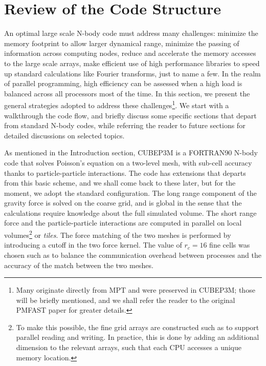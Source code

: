 
\section{Review of the Code Structure}
\label{sec:structure}


An optimal large scale N-body code must address many challenges: minimize the memory footprint to allow larger dynamical range,
minimize the passing of information across computing nodes, reduce and accelerate the memory accesses to the large scale arrays, 
make efficient use of high performance libraries to speed up standard calculations like Fourier transforms, just to name a few.
In the realm of parallel programming, high efficiency  can be assessed when a high load is balanced across all processors
most of the time. In this section, we present the general strategies adopted to address these challenges\footnote{ 
Many originate directly from MPT and were preserved in {\small CUBEP3M};
those will be briefly mentioned, and we shall refer the reader to the original {\small PMFAST} paper for greater details.}.
We start with a walkthrough the code flow, and briefly discuss some specific sections that depart from standard N-body codes,
while referring the reader to future sections for detailed discussions on selected topics.


As mentioned in the Introduction section, {\small CUBEP3M} is a {\small FORTRAN90} 
N-body code that solves Poisson's equation on a two-level mesh, 
with sub-cell accuracy thanks to particle-particle interactions. 
The code has extensions that departs from this basic scheme, and
we shall come back to these later, but for the moment, we adopt the 
standard configuration. 
The long range component of the gravity force is solved on the coarse grid, 
and is global in the sense that the calculations require knowledge about the full simulated volume.
The short range force and the particle-particle interactions are computed in parallel on local volumes\footnote{To make this possible, the fine grid arrays are constructed such as to support parallel reading and writing. In practice, this is done by adding an additional dimension to the relevant arrays, such that each {\small CPU} accesses a unique memory location.} or {\it tiles}. The force matching of the two meshes is performed by introducing a cutoff in the two force kernel. The value of $r_{c}=16$ fine cells was chosen such as to balance the communication 
overhead between processes and the accuracy of the match between the two meshes. 

